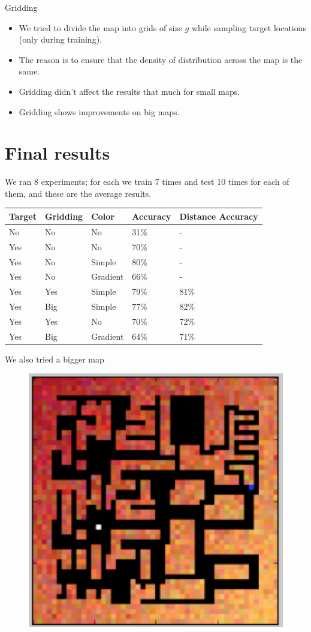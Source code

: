\documentclass{beamer}
\begin{document}
\begin{frame}{Gridding}
\begin{itemize}
    \item We tried to divide the map into grids of size $g$ while sampling target locations (only during training).
    \item The reason is to ensure that the density of distribution across the map is the same.
    \item Gridding didn't affect the results that much for small maps.
    \item Gridding shows improvements on big maps.
\end{itemize}
\end{frame}

\section{Final results}
\begin{frame}
We ran 8 experiments; for each we train 7 times and test 10 times for each of them, and these are the average results.
\begin{center}
    \begin{tabular}{| l | l | l | l | l |}
    \hline
    Target & Gridding & Color & Accuracy & Distance Accuracy \\ \hline
    No & No & No & 31\% & - \\ \hline
    Yes & No & No & 70\% & - \\ \hline
    Yes & No & Simple & 80\% & - \\ \hline
    Yes & No & Gradient & 66\% & - \\ \hline
    Yes & Yes & Simple & 79\% & 81\% \\ \hline
    Yes & Big& Simple & 77\% & 82\% \\ \hline
    Yes & Yes & No & 70\% & 72\% \\ \hline
    Yes & Big & Gradient & 64\% & 71\% \\ \hline
    \end{tabular}
\end{center}
\end{frame}

\begin{frame}
We also tried a bigger map
\begin{figure}
        \includegraphics[width=0.45\linewidth]{bigmap.png}
    \label{fig2}
\end{figure}
\end{frame}
\end{document}
